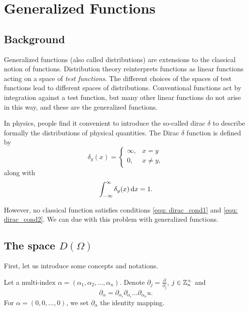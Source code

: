 \chapter{Generalized Functions}
\section{Background}
Generalized functions (also called distributions) are extensions to the 
classical notion of functions. Distribution theory reinterprets functions 
as linear functions acting on a space of \emph{test functions}. The 
different choices of the spaces of test functions lead to different spaces 
of distributions. Conventional functions act by integration against a test 
function, but many other linear functions do not arise in this way, and 
these are the generalized functions.

In physics, people find it convenient to introduce the so-called dirac 
$\delta$ to describe formally the distributions of physical quantities. 
The Dirac $\delta$ function is defined by 
\begin{equation}
\label{equ: dirac_cond1}
    \delta_y (x) = \begin{cases}
        \infty, & x = y \\
        0, & x \neq y, 
    \end{cases}
\end{equation}
along with 
\begin{equation}
\label{equ: dirac_cond2}
    \int _{-\infty} ^\infty \delta_y(x) \mathop{}\!\mathrm{d} x = 1.
\end{equation}

However, no classical function satisfies conditions \ref{equ: dirac_cond1} 
and \ref{equ: dirac_cond2}. We can due with this problem with generalized 
functions.

\section{The space $D(\Omega)$}
First, let us introduce some concepts and notations.

\begin{defn}
Let a multi-index $\alpha = (\alpha_1, \alpha_2, \ldots, 
\alpha_n)$. Denote $\partial _j = \frac{\partial}{\partial_j}$, $j \in 
\mathbb{Z} ^+_n$ and 
\begin{equation}
    \partial_\alpha = \partial_{\alpha_i} \partial_{\alpha_i}  \dots 
    \partial_{\alpha_n} u.
\end{equation}
For $\alpha = (0, 0, \ldots, 0)$, we set $\partial_\alpha$ the identity 
mapping.
\end{defn}

